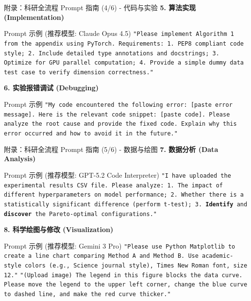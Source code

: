 \documentclass[aspectratio=169,11pt]{beamer}
\begin{document}
\begin{frame}{附录：科研全流程 Prompt 指南 (4/6) - 代码与实验}
    \textbf{5. 算法实现 (Implementation)}
    \begin{exampleblock}{Prompt 示例 (推荐模型: Claude Opus 4.5)}
        \small
        \texttt{"Please implement Algorithm 1 from the appendix using PyTorch. Requirements: 1. PEP8 compliant code style; 2. Include detailed type annotations and docstrings; 3. Optimize for GPU parallel computation; 4. Provide a simple dummy data test case to verify dimension correctness."}
    \end{exampleblock}
    
    \vspace{0.3cm}
    \textbf{6. 实验报错调试 (Debugging)}
    \begin{exampleblock}{Prompt 示例}
        \small
        \texttt{"My code encountered the following error: [paste error message]. Here is the relevant code snippet: [paste code]. Please analyze the root cause and provide the fixed code. Explain why this error occurred and how to avoid it in the future."}
    \end{exampleblock}
\end{frame}

\begin{frame}{附录：科研全流程 Prompt 指南 (5/6) - 数据与绘图}
    \textbf{7. 数据分析 (Data Analysis)}
    \begin{exampleblock}{Prompt 示例 (推荐模型: GPT-5.2 Code Interpreter)}
        \small
        \texttt{"I have uploaded the experimental results CSV file. Please analyze: 1. The impact of different hyperparameters on model performance; 2. Whether there is a statistically significant difference (perform t-test); 3. \textbf{Identify} and \textbf{discover} the Pareto-optimal configurations."}
    \end{exampleblock}
    
    \vspace{0.3cm}
    \textbf{8. 科学绘图与修改 (Visualization)}
    \begin{exampleblock}{Prompt 示例 (推荐模型: Gemini 3 Pro)}
        \small
        \texttt{"Please use Python Matplotlib to create a line chart comparing Method A and Method B. Use academic-style colors (e.g., Science journal style), Times New Roman font, size 12."}
        \vspace{0.1cm}
        \texttt{"(Upload image) The legend in this figure blocks the data curve. Please move the legend to the upper left corner, change the blue curve to dashed line, and make the red curve thicker."}
    \end{exampleblock}
\end{frame}
\end{document}
